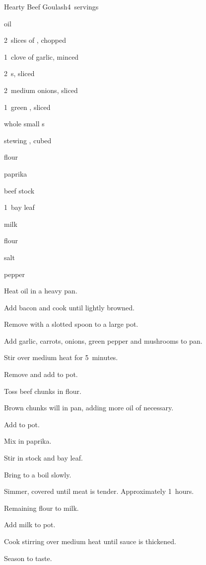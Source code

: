 \begin{recipe}{Hearty Beef Goulash}{}{4~servings}

\begin{ingredients}
\item {} oil
\item 2~slices of , chopped
\item 1~clove of garlic, minced
\item 2~s, sliced
\item 2~medium onions, sliced
\item 1~green , sliced
\item \lbs{\quarter} whole small s
\item \lbs{1\half} stewing , cubed
\item \C{\quarter} flour
\item {} paprika
\item {} beef stock
\item 1~bay leaf
\item {} milk
\item {} flour
\item salt
\item pepper
\end{ingredients}

\begin{directions}
\item Heat oil in a heavy pan.
\item Add bacon and cook until lightly browned.
\item Remove with a slotted spoon to a large pot.
\item Add garlic, carrots, onions, green pepper and mushrooms to pan.
\item Stir over medium heat for 5~minutes.
\item Remove and add to pot.
\item Toss beef chunks in flour.
\item Brown chunks will in pan, adding more oil of necessary.
\item Add to pot.
\item Mix in paprika.
\item Stir in stock and bay leaf.
\item Bring to a boil slowly.
\item Simmer, covered until meat is tender. Approximately 1\half~hours.
\item Remaining flour to milk.
\item Add milk to pot.
\item Cook stirring over medium heat until sauce is thickened.
\item Season to taste.
\end{directions}

\end{recipe}
